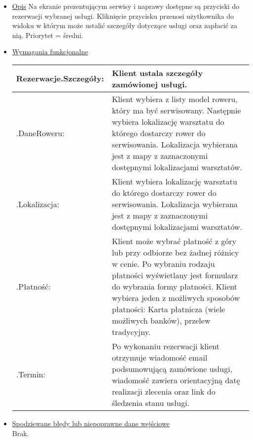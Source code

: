 \documentclass[a4paper,20pt]{article}
\begin{document}
\begin{itemize}
\item \underline{Opis} 
\newline
\newline
Na ekranie prezentującym serwisy i naprawy dostępne są przyciski do rezerwacji wybranej usługi. Kliknięcie przycisku przenosi użytkownika do widoku w którym może ustalić szczegóły dotyczące usługi oraz zapłacić za nią. Priorytet = średni.
\newline

\item \underline{Wymagania funkcjonalne}

\begin{center}
\begin{tabularx}{\textwidth}[t]{XX}


\arrayrulecolor{black}\hline
\textbf{Rezerwacje.Szczegóły:} & \textbf{Klient ustala szczegóły zamówionej usługi.} \\

\hline

\quad .DaneRoweru: & 
\begin{minipage}[t]{\linewidth}%
Klient wybiera z listy model roweru, który ma być serwisowany. Następnie wybiera lokalizację warsztatu do którego dostarczy rower do serwisowania. Lokalizacja wybierana jest z mapy z zaznaczonymi dostępnymi lokalizacjami warsztatów. 
\end{minipage} \\

\quad .Lokalizacja: & 
\begin{minipage}[t]{\linewidth}%
Klient wybiera lokalizację warsztatu do którego dostarczy rower do serwisowania. Lokalizacja wybierana jest z mapy z zaznaczonymi dostępnymi lokalizacjami warsztatów. 
\end{minipage} \\


\quad .Płatność: & 
\begin{minipage}[t]{\linewidth}%
Klient może wybrać płatność z góry lub przy odbiorze bez żadnej różnicy w cenie. Po wybraniu rodzaju płatności wyświetlany jest formularz do wybrania formy płatności. Klient wybiera jeden z możliwych sposobów płatności: Karta płatnicza (wiele możliwych banków), przelew tradycyjny. 
\end{minipage} \\



\quad .Termin: & 
\begin{minipage}[t]{\linewidth}%
Po wykonaniu rezerwacji klient otrzymuje wiadomość email podsumowującą zamówione usługi, wiadomość zawiera orientacyjną datę realizacji zlecenia oraz link do śledzenia stanu usługi. 
\end{minipage} \\


\end{tabularx}
\end{center}


\item \underline{Spodziewane błędy lub niepoprawne dane wejściowe}
\\ 
Brak.


\end{itemize}
\end{document}
